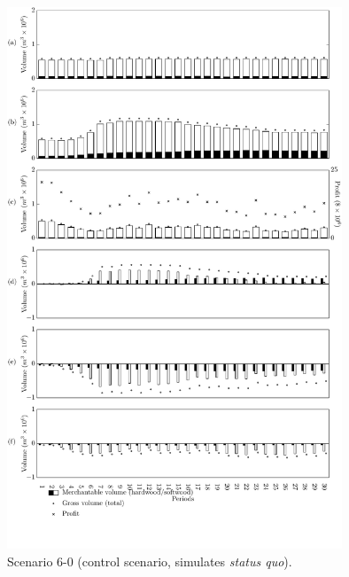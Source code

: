 \begin{figure}[h]
  \centering
  \includegraphics[width=10cm]{images/appendix/s6-0}
  \caption{Scenario 6-0 (control scenario, simulates \emph{status quo}).}
  \label{fig:s6-0}
\end{figure}


